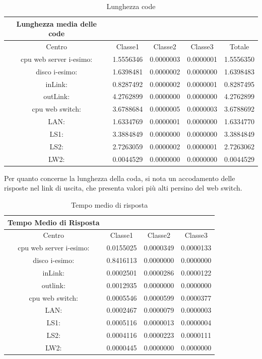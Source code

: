 \begin{table}[H]
\begin{center}
\begin{tabular}{||c|c|c|c|c||}
\hline
Lunghezza media delle code\\
\hline
Centro &Classe1 &Classe2 &Classe3 &Totale\\
\hline
\hline
 cpu web server i-esimo: 	&1.5556346	&0.0000003	&0.0000001	&1.5556350\\
\hline
 disco i-esimo: 	&1.6398481	&0.0000002	&0.0000000	&1.6398483\\
\hline
 inLink: 	&0.8287492	&0.0000002	&0.0000001	&0.8287495\\
\hline
 outLink: 	&4.2762899	&0.0000000	&0.0000000	&4.2762899\\
\hline
 cpu web switch: 	&3.6788684	&0.0000005	&0.0000003	&3.6788692\\
\hline
 LAN: 	&1.6334769	&0.0000001	&0.0000000	&1.6334770\\
\hline
 LS1: 	&3.3884849	&0.0000000	&0.0000000	&3.3884849\\
\hline
 LS2: 	&2.7263059	&0.0000002	&0.0000001	&2.7263062\\
\hline
 LW2: 	&0.0044529	&0.0000000	&0.0000000	&0.0044529\\
\hline
\end{tabular}
\end{center}
\caption{Lunghezza code}
\label{ris}
\end{table}
Per quanto concerne la lunghezza della coda, si nota un accodamento delle risposte nel link di uscita, che presenta valori più alti persino del web switch.
\begin{table}[htbp]
\caption{Tempo medio di risposta}
\begin{center}
\begin{tabular}{|c|c|c|c|}
\hline
Tempo Medio di Risposta\\
\hline
Centro &Classe1 &Classe2 &Classe3\\
\hline
\hline
 cpu web server i-esimo: 	&0.0155025	&0.0000349	&0.0000133\\
\hline
 disco i-esimo: 	&0.8416113	&0.0000000	&0.0000000\\
\hline
 inLink: 	&0.0002501	&0.0000286	&0.0000122\\
\hline
 outlink: 	&0.0012935	&0.0000000	&0.0000000\\
\hline
 cpu web switch: 	&0.0005546	&0.0000599	&0.0000377\\
\hline
 LAN: 	&0.0002467	&0.0000079	&0.0000003\\
\hline
 LS1: 	&0.0005116	&0.0000013	&0.0000004\\
\hline
 LS2: 	&0.0004116	&0.0000223	&0.0000111\\
\hline
 LW2: 	&0.0000445	&0.0000000	&0.0000000\\
\hline
\end{tabular}
\end{center}
\label{tempomediorisposta}
\end{table}
